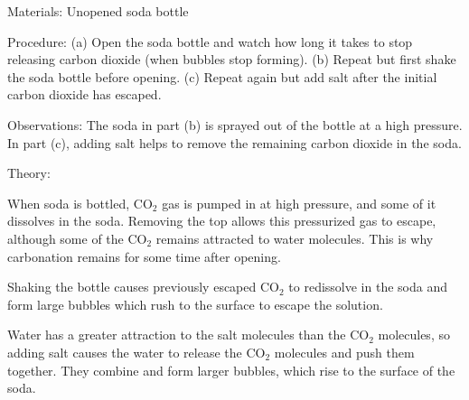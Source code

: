 \begin{multicols}{2}
\begin{description*}
\item[Materials:]{Unopened soda bottle}
\item[Procedure:]{(a) Open the soda bottle and watch how long it takes to stop releasing carbon dioxide (when bubbles stop forming). (b) Repeat but first shake the soda bottle before opening. (c) Repeat again but add salt after the initial carbon dioxide has escaped. }
\item[Observations:]{The soda in part (b) is sprayed out of the bottle at a high pressure. In part (c), adding salt helps to remove the remaining carbon dioxide in the soda.}
\item[Theory:]{When soda is bottled, CO$_2$ gas is pumped in at high pressure, and some of it dissolves in the soda. Removing the top allows this pressurized gas to escape, although some of the CO$_2$ remains attracted to water molecules. This is why carbonation remains for some time after opening. 

Shaking the bottle causes previously escaped CO$_2$ to redissolve in the soda and form large bubbles which rush to the surface to escape the solution.

Water has a greater attraction to the salt molecules than the CO$_2$ molecules, so adding salt causes the water to release the CO$_2$ molecules and push them together. They combine and form larger bubbles, which rise to the surface of the soda.}
\end{description*}



\end{multicols}

\pagebreak